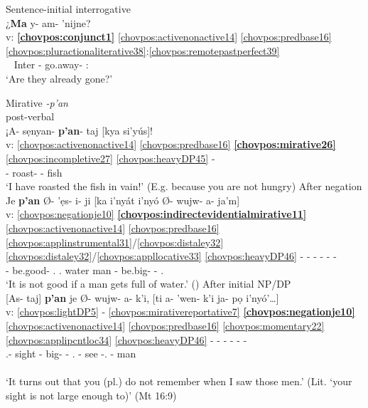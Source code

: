 \documentclass[output=paper]{langscibook}
\begin{document}
    \ex\label{bkm:Ref87657872} Sentence-initial interrogative\\ {
    \glll {} ¿\textbf{Ma} y- am- 'nijne? \\ 
    v: \textbf{\ref{chovpos:conjunct1}} \ref{chovpos:activenonactive14} \ref{chovpos:predbase16} \ref{chovpos:pluractionaliterative38}:\ref{chovpos:remotepastperfect39}\\ 
    \ {} Inter{} \Third{}- go.away- \Plact:\Prf{}\\ 
    \glt `Are they already gone?'
    }
    \z
\z 


\ea\label{bkm:Ref87658388} Mirative \textit{-p'an}\\ 
    \ea\label{bkm:Ref87657876} post-verbal\\ { 
    \glll {} ¡A- sẹnyan- \textbf{p'an}{}- taj [kya si'yús]!\\ 
    v: \ref{chovpos:activenonactive14} \ref{chovpos:predbase16} \textbf{\ref{chovpos:mirative26}} \ref{chovpos:incompletive27} \ref{chovpos:heavyDP45} - \\ 
    {} \First{}- roast- \Mir{}- \Incomp{} \Dem{} fish\\ 
    \glt `I have roasted the fish in vain!' (E.g. because you are not hungry)
    }
    \ex\label{bkm:Ref84109704}\label{bkm:Ref87657878} After negation\\ {
    \glll {} Je \textbf{p'an} Ø{}- 'ẹs- i- ji [ka i'nyát i'nyó Ø{}- wujw- a- ja'm]\\
    v: \ref{chovpos:negationje10} \textbf{\ref{chovpos:indirectevidentialmirative11}} \ref{chovpos:activenonactive14} \ref{chovpos:predbase16} 
    \ref{chovpos:applinstrumental31}/\ref{chovpos:distaley32}
    \ref{chovpos:distaley32}/\ref{chovpos:appllocative33} \ref{chovpos:heavyDP46} - - - - - -\\ 
    {} \Neg{} \Mir{} \Third{}- be.good- \Ap.\Ins{} \Ap.\Loc{} \Comp{} water man \Third{}- be.big- \Irr{}- \Ap.\Loc{}\\ 
    \glt `It is not good if a man gets full of water.' (\citealt[116]{DraysonGomez2000})
    }
    \ex\label{bkm:Ref87657881} After initial NP/DP\\ {
    \glll {} [As- taj] \textbf{p'an} je Ø{}- wujw- a- k'i, [ti a- 'wen- k'i ja- pọ i'nyó'…]\\ 
    v: \ref{chovpos:lightDP5} - \ref{chovpos:mirativereportative7} \textbf{\ref{chovpos:negationje10}} \ref{chovpos:activenonactive14} \ref{chovpos:predbase16} \ref{chovpos:momentary22} \ref{chovpos:applipcntloc34} \ref{chovpos:heavyDP46} - - - - - -\\ 
    {} \Second\Pl{}.\Poss{}- sight \Mir{} \Neg{} \Third{}- big- \Mom{}-  \Ap.\Distr{} \Comp{} \First{}- see -\Ap.\Distr{} \Dem{}- \Pl{} man\\\\ 
    \glt `It turns out that you (pl.) do not remember when I saw those men.' (Lit. `your sight is not large enough to)' (Mt 16:9)
    }
    \z 
\z 
\end{document}

